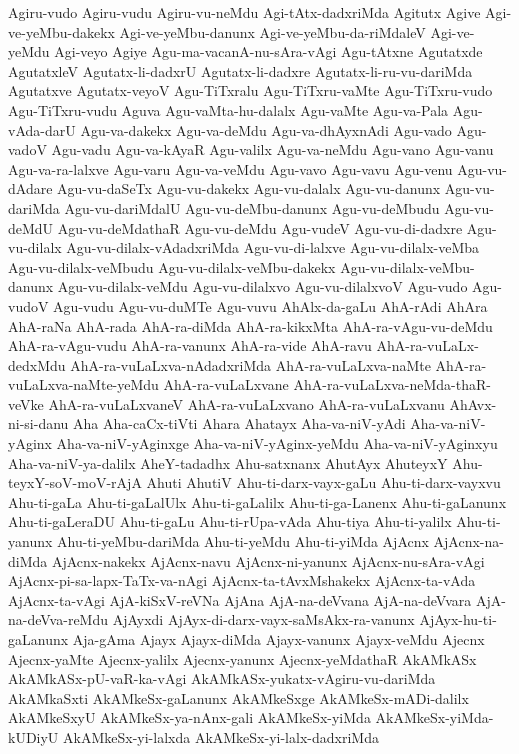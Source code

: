 {Agiru-vudo
Agiru-vudu
Agiru-vu-neMdu
Agi-tAtx-dadxriMda
Agitutx
Agive
Agi-ve-yeMbu-dakekx
Agi-ve-yeMbu-danunx
Agi-ve-yeMbu-da-riMdaleV
Agi-ve-yeMdu
Agi-veyo
Agiye
Agu-ma-vacanA-nu-sAra-vAgi
Agu-tAtxne
Agutatxde
AgutatxleV
Agutatx-li-dadxrU
Agutatx-li-dadxre
Agutatx-li-ru-vu-dariMda
Agutatxve
Agutatx-veyoV
Agu-TiTxralu
Agu-TiTxru-vaMte
Agu-TiTxru-vudo
Agu-TiTxru-vudu
Aguva
Agu-vaMta-hu-dalalx
Agu-vaMte
Agu-va-Pala
Agu-vAda-darU
Agu-va-dakekx
Agu-va-deMdu
Agu-va-dhAyxnAdi
Agu-vado
Agu-vadoV
Agu-vadu
Agu-va-kAyaR
Agu-valilx
Agu-va-neMdu
Agu-vano
Agu-vanu
Agu-va-ra-lalxve
Agu-varu
Agu-va-veMdu
Agu-vavo
Agu-vavu
Agu-venu
Agu-vu-dAdare
Agu-vu-daSeTx
Agu-vu-dakekx
Agu-vu-dalalx
Agu-vu-danunx
Agu-vu-dariMda
Agu-vu-dariMdalU
Agu-vu-deMbu-danunx
Agu-vu-deMbudu
Agu-vu-deMdU
Agu-vu-deMdathaR
Agu-vu-deMdu
Agu-vudeV
Agu-vu-di-dadxre
Agu-vu-dilalx
Agu-vu-dilalx-vAdadxriMda
Agu-vu-di-lalxve
Agu-vu-dilalx-veMba
Agu-vu-dilalx-veMbudu
Agu-vu-dilalx-veMbu-dakekx
Agu-vu-dilalx-veMbu-danunx
Agu-vu-dilalx-veMdu
Agu-vu-dilalxvo
Agu-vu-dilalxvoV
Agu-vudo
Agu-vudoV
Agu-vudu
Agu-vu-duMTe
Agu-vuvu
AhAlx-da-gaLu
AhA-rAdi
AhAra
AhA-raNa
AhA-rada
AhA-ra-diMda
AhA-ra-kikxMta
AhA-ra-vAgu-vu-deMdu
AhA-ra-vAgu-vudu
AhA-ra-vanunx
AhA-ra-vide
AhA-ravu
AhA-ra-vuLaLx-dedxMdu
AhA-ra-vuLaLxva-nAdadxriMda
AhA-ra-vuLaLxva-naMte
AhA-ra-vuLaLxva-naMte-yeMdu
AhA-ra-vuLaLxvane
AhA-ra-vuLaLxva-neMda-thaR-veVke
AhA-ra-vuLaLxvaneV
AhA-ra-vuLaLxvano
AhA-ra-vuLaLxvanu
AhAvx-ni-si-danu
Aha
Aha-caCx-tiVti
Ahara
Ahatayx
Aha-va-niV-yAdi
Aha-va-niV-yAginx
Aha-va-niV-yAginxge
Aha-va-niV-yAginx-yeMdu
Aha-va-niV-yAginxyu
Aha-va-niV-ya-dalilx
AheY-tadadhx
Ahu-satxnanx
AhutAyx
AhuteyxY
Ahu-teyxY-soV-moV-rAjA
Ahuti
AhutiV
Ahu-ti-darx-vayx-gaLu
Ahu-ti-darx-vayxvu
Ahu-ti-gaLa
Ahu-ti-gaLalUlx
Ahu-ti-gaLalilx
Ahu-ti-ga-Lanenx
Ahu-ti-gaLanunx
Ahu-ti-gaLeraDU
Ahu-ti-gaLu
Ahu-ti-rUpa-vAda
Ahu-tiya
Ahu-ti-yalilx
Ahu-ti-yanunx
Ahu-ti-yeMbu-dariMda
Ahu-ti-yeMdu
Ahu-ti-yiMda
AjAcnx
AjAcnx-na-diMda
AjAcnx-nakekx
AjAcnx-navu
AjAcnx-ni-yanunx
AjAcnx-nu-sAra-vAgi
AjAcnx-pi-sa-lapx-TaTx-va-nAgi
AjAcnx-ta-tAvxMshakekx
AjAcnx-ta-vAda
AjAcnx-ta-vAgi
AjA-kiSxV-reVNa
AjAna
AjA-na-deVvana
AjA-na-deVvara
AjA-na-deVva-reMdu
AjAyxdi
AjAyx-di-darx-vayx-saMsAkx-ra-vanunx
AjAyx-hu-ti-gaLanunx
Aja-gAma
Ajayx
Ajayx-diMda
Ajayx-vanunx
Ajayx-veMdu
Ajecnx
Ajecnx-yaMte
Ajecnx-yalilx
Ajecnx-yanunx
Ajecnx-yeMdathaR
AkAMkASx
AkAMkASx-pU-vaR-ka-vAgi
AkAMkASx-yukatx-vAgiru-vu-dariMda
AkAMkaSxti
AkAMkeSx-gaLanunx
AkAMkeSxge
AkAMkeSx-mADi-dalilx
AkAMkeSxyU
AkAMkeSx-ya-nAnx-gali
AkAMkeSx-yiMda
AkAMkeSx-yiMda-kUDiyU
AkAMkeSx-yi-lalxda
AkAMkeSx-yi-lalx-dadxriMda
}
